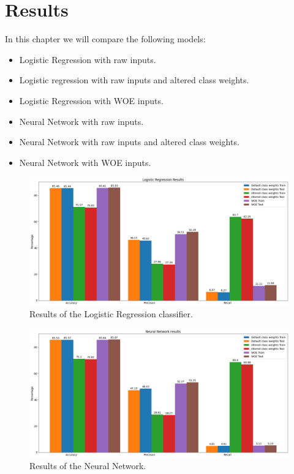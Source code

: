 \section{Results}
In this chapter we will compare the following models:
\begin{itemize}
    \item Logistic Regression with raw inputs.
    \item Logistic regression with raw inputs and altered class weights.
    \item Logistic Regression with WOE inputs.
    \item Neural Network with raw inputs.
    \item Neural Network with raw inputs and altered class weights.
    \item Neural Network with WOE inputs.
\end{itemize}

\begin {figure}[!htpb]
\centering
  \includegraphics[width=\linewidth]{Credit_Images/Results_Logistic.png}
   \caption{Results of the Logistic Regression classifier.}
    \label{fig-log-results}
\end{figure}
\begin {figure}[!htpb]
\centering
  \includegraphics[width=\linewidth]{Credit_Images/NN_res.png}
   \caption{Results of the Neural Network.}
    \label{fig-nn-results}
\end{figure}

